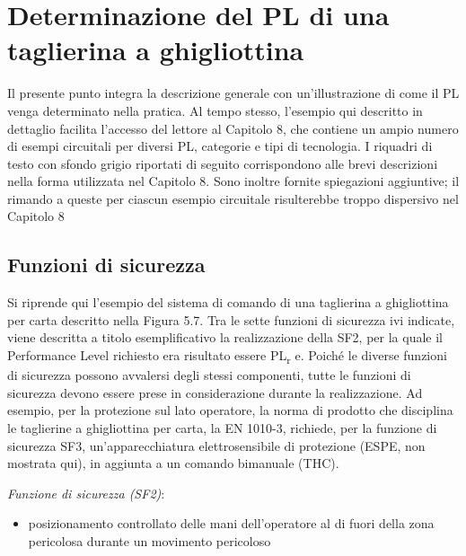 \section{Determinazione del PL di una taglierina a ghigliottina}
\label{sec:06-5}
Il presente punto integra la descrizione generale con un'illustrazione di come il PL venga determinato nella pratica. Al tempo stesso, l'esempio qui descritto in dettaglio facilita l'accesso del lettore al Capitolo 8, che contiene un ampio numero di esempi circuitali per diversi PL, categorie e tipi di tecnologia.
I riquadri di testo con sfondo grigio riportati di seguito corrispondono alle brevi descrizioni nella forma utilizzata nel Capitolo 8. Sono inoltre fornite spiegazioni aggiuntive; il rimando a queste per ciascun esempio circuitale risulterebbe troppo dispersivo nel Capitolo 8

\subsection{Funzioni di sicurezza}
\label{subsec:06-5-1}
Si riprende qui l'esempio del sistema di comando di una taglierina a ghigliottina per carta descritto nella Figura 5.7. Tra le sette funzioni di sicurezza ivi indicate, viene descritta a titolo esemplificativo la realizzazione della SF2, per la quale il Performance Level richiesto era risultato essere PL\textsubscript{r} e. Poiché le diverse funzioni di sicurezza possono avvalersi degli stessi componenti, tutte le funzioni di sicurezza devono essere prese in considerazione durante la realizzazione. Ad esempio, per la protezione sul lato operatore, la norma di prodotto che disciplina le taglierine a ghigliottina per carta, la EN 1010-3, richiede, per la funzione di sicurezza SF3, un'apparecchiatura elettrosensibile di protezione (ESPE, non mostrata qui), in aggiunta a un comando bimanuale (THC).

\textit{Funzione di sicurezza (SF2)}:
\begin{itemize}
    \item posizionamento controllato delle mani dell'operatore al di fuori della zona pericolosa durante un movimento pericoloso
\end{itemize}

